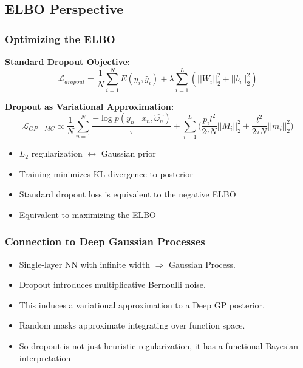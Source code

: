 \documentclass[
	11pt, %
]{beamer}
\begin{document}

\subsection{ELBO Perspective}

\begin{frame}
	\frametitle{Optimizing the ELBO}

	\textbf{Standard Dropout Objective:}
	\[
	\mathcal{L}_{dropout}
	=
	\frac{1}{N}\sum_{i=1}^N E(y_i,\hat{y}_i)
	+
	\lambda \sum_{i=1}^L (||W_i||_2^2 + ||b_i||_2^2)
	\]

	\bigskip

	\textbf{Dropout as Variational Approximation:}
		\[
		\mathcal{L}_{GP-MC} 
		\propto 
		\frac{1}{N} \sum_{n=1}^{N} 
		\frac{- \log p(y_n \mid x_n, \hat{\omega_n})}{\tau} +
		\sum_{i=1}^{L}\Big( \frac{p_il^2}{2\tau N}||M_i||_2^2 + \frac{l^2}{2\tau N}||m_i||^2_2\Big)
		\]

	\bigskip


	\begin{itemize}
		\item $L_2$ regularization $\leftrightarrow$ Gaussian prior
		\item Training minimizes KL divergence to posterior
		\item \alert{Standard dropout loss} is equivalent to the \alert{negative ELBO}
		\item Equivalent to maximizing the ELBO
	\end{itemize}

\end{frame}

\begin{frame}
	\frametitle{Connection to Deep Gaussian Processes}

	\begin{itemize}
		\item Single-layer NN with infinite width $\Rightarrow$ Gaussian Process.
		\item Dropout introduces multiplicative Bernoulli noise.
		\item This induces a variational approximation to a Deep GP posterior.
		\item Random masks approximate integrating over function space.
		\item So dropout is not just heuristic regularization, it has a \alert{functional Bayesian interpretation}
	\end{itemize}

\end{frame}
\end{document}
